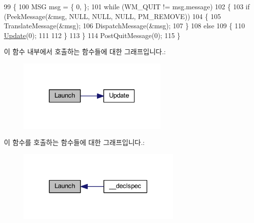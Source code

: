 \begin{DoxyCode}
99 \{
100     MSG msg = \{ 0, \};
101     \textcolor{keywordflow}{while} (WM\_QUIT != msg.message)
102     \{
103         \textcolor{keywordflow}{if} (PeekMessage(&msg, NULL, NULL, NULL, PM\_REMOVE))
104         \{
105             TranslateMessage(&msg);
106             DispatchMessage(&msg);
107         \}
108         \textcolor{keywordflow}{else}
109         \{
110             \hyperlink{class_comet_engine_1_1_comet_engine_win32_a5ceefb272acf4d0adb4964ec29e5996e}{Update}(0);
111 
112         \}
113     \}
114     PostQuitMessage(0);
115 \}
\end{DoxyCode}
이 함수 내부에서 호출하는 함수들에 대한 그래프입니다.\+:\nopagebreak
\begin{figure}[H]
\begin{center}
\leavevmode
\includegraphics[width=211pt]{class_comet_engine_1_1_comet_engine_win32_abe9b413e3c019ccee4f87ab0071c5aad_cgraph}
\end{center}
\end{figure}
이 함수를 호출하는 함수들에 대한 그래프입니다.\+:\nopagebreak
\begin{figure}[H]
\begin{center}
\leavevmode
\includegraphics[width=230pt]{class_comet_engine_1_1_comet_engine_win32_abe9b413e3c019ccee4f87ab0071c5aad_icgraph}
\end{center}
\end{figure}
\mbox{\label{class_comet_engine_1_1_comet_engine_win32_a35f30fb8a7991557468d2fc3b25ff0b7}} 
